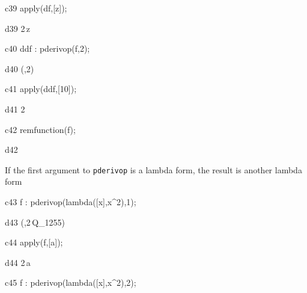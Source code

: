 \documentclass[12pt]{article}
\begin{document}
\begin{mcline}{c39}
   apply(df,[z]);
\end{mcline}



\begin{mdline}{d39}
   2\,z
\end{mdline}

\begin{mcline}{c40}
   ddf : pderivop(f,2);
\end{mcline}



\begin{mdline}{d40}
   \lambda\left(\left[ Q_{1254} \right] ,2\right)
\end{mdline}

\begin{mcline}{c41}
   apply(ddf,[10]);
\end{mcline}



\begin{mdline}{d41}
   2
\end{mdline}

\begin{mcline}{c42}
   remfunction(f);
\end{mcline}



\begin{mdline}{d42}
   \left[ f \right] 
\end{mdline}


If the first argument to {\tt pderivop} is a lambda form, the
result is another lambda form



\begin{mcline}{c43}
     f : pderivop(lambda([x],x^2),1);
\end{mcline}



\begin{mdline}{d43}
   \lambda\left(\left[ Q_{1255} \right] ,2\,Q_{1255}\right)
\end{mdline}

\begin{mcline}{c44}
   apply(f,[a]);
\end{mcline}



\begin{mdline}{d44}
   2\,a
\end{mdline}

\begin{mcline}{c45}
   f : pderivop(lambda([x],x^2),2);
\end{mcline}
\end{document}
